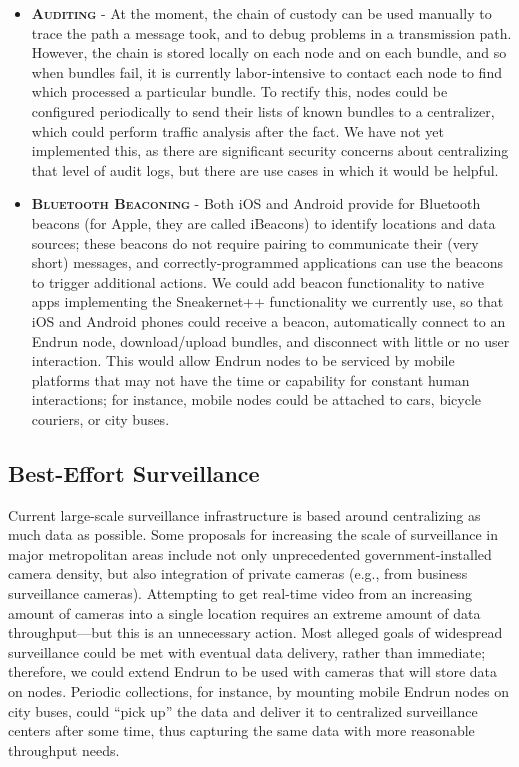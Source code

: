\documentclass[12pt]{article}
\begin{document}
  \begin{itemize}
    \item \textbf{\textsc{Auditing}} - At the moment, the chain of custody can be used manually to trace the path a message took, and to debug problems in a transmission path. However, the chain is stored locally on each node and on each bundle, and so when bundles fail, it is currently labor-intensive to contact each node to find which processed a particular bundle. To rectify this, nodes could be configured periodically to send their lists of known bundles to a centralizer, which could perform traffic analysis after the fact. We have not yet implemented this, as there are significant security concerns about centralizing that level of audit logs, but there are use cases in which it would be helpful.
    
    \item \textbf{\textsc{Bluetooth Beaconing}} - Both iOS and Android provide for Bluetooth beacons (for Apple, they are called iBeacons) to identify locations and data sources; these beacons do not require pairing to communicate their (very short) messages, and correctly-programmed applications can use the beacons to trigger additional actions. We could add beacon functionality to native apps implementing the Sneakernet++ functionality we currently use, so that iOS and Android phones could receive a beacon, automatically connect to an Endrun node, download/upload bundles, and disconnect with little or no user interaction. This would allow Endrun nodes to be serviced by mobile platforms that may not have the time or capability for constant human interactions; for instance, mobile nodes could be attached to cars, bicycle couriers, or city buses.
  \end{itemize}
  
  \subsection{Best-Effort Surveillance}
  
  Current large-scale surveillance infrastructure is based around centralizing as much data as possible. Some proposals for increasing the scale of surveillance in major metropolitan areas include not only unprecedented government-installed camera density, but also integration of private cameras (e.g., from business surveillance cameras). Attempting to get real-time video from an increasing amount of cameras into a single location requires an extreme amount of data throughput---but this is an unnecessary action. Most alleged goals of widespread surveillance could be met with eventual data delivery, rather than immediate; therefore, we could extend Endrun to be used with cameras that will store data on nodes. Periodic collections, for instance, by mounting mobile Endrun nodes on city buses, could ``pick up'' the data and deliver it to centralized surveillance centers after some time, thus capturing the same data with more reasonable throughput needs.
  
\end{document}
